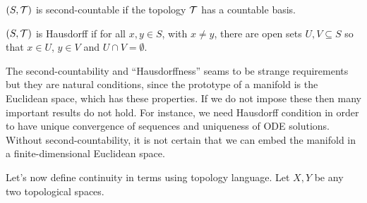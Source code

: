 \begin{definition}
	$(S,\mathcal{T})$ is second-countable if the topology $\mathcal{T}$ has a countable basis.
\end{definition}

\begin{definition}
	$(S,\mathcal{T})$ is Hausdorff if for all $x,y \in S$, with $x\ne y$, there are open sets $U, V \subseteq S$ so that $x \in U$, $y\in V$ and $U\cap V=\emptyset$.
	\begin{figure}[H]
		\centering
	\end{figure}
\end{definition}

The second-countability and ``Hausdorffness'' seams to be strange requirements but they are natural conditions, since the prototype of a manifold is the Euclidean space, which has these properties. If we do not impose these then many important results do not hold. For instance, we need Hausdorff condition in order to have unique convergence of sequences and uniqueness of ODE solutions.
Without second-countability, it is not certain that we can embed the manifold in a finite-dimensional Euclidean space.

Let's now define continuity in terms using topology language. Let $X, Y$ be any two topological spaces.

